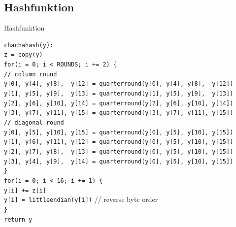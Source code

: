 \documentclass{beamer}
\begin{document}
\subsection{Hashfunktion}
\begin{frame}{Hashfunktion}
\begin{center}
\begin{minipage}{\linewidth}
\scriptsize
\texttt{chachahash(y):} \\
\hspace*{2em}\texttt{z = copy(y)}\\
\hspace*{2em}\texttt{for(i = 0; i < ROUNDS; i += 2) \{}\\
\hspace*{4em}\texttt{// column round}\\
\hspace*{4em}\texttt{y[0], y[4], y[8], \ y[12] = quarterround(y[0], y[4], y[8], \  y[12])}\\
\hspace*{4em}\texttt{y[1], y[5], y[9], \ y[13] = quarterround(y[1], y[5], y[9], \  y[13])}\\
\hspace*{4em}\texttt{y[2], y[6], y[10], y[14] = quarterround(y[2], y[6], y[10], y[14])}\\
\hspace*{4em}\texttt{y[3], y[7], y[11], y[15] = quarterround(y[3], y[7], y[11], y[15])}\\
\hspace*{4em}\texttt{// diagonal round}\\
\hspace*{4em}\texttt{y[0], y[5], y[10], y[15] = quarterround(y[0], y[5], y[10], y[15])}\\
\hspace*{4em}\texttt{y[1], y[6], y[11], y[12] = quarterround(y[0], y[5], y[10], y[15])}\\
\hspace*{4em}\texttt{y[2], y[7], y[8], \  y[13] = quarterround(y[0], y[5], y[10], y[15])}\\
\hspace*{4em}\texttt{y[3], y[4], y[9], \  y[14] = quarterround(y[0], y[5], y[10], y[15])}\\
\hspace*{2em}\texttt{\}}\\
\hspace*{2em}\texttt{for(i = 0; i < 16; i += 1) \{}\\
\hspace*{4em}\texttt{y[i] += z[i]}\\
\hspace*{4em}\texttt{y[i] = littleendian(y[i])}  // reverse byte order\\
\hspace*{2em}\texttt{\}}\\
\hspace*{2em}\texttt{return y}
\end{minipage}
\end{center}
\end{frame}
\end{document}
